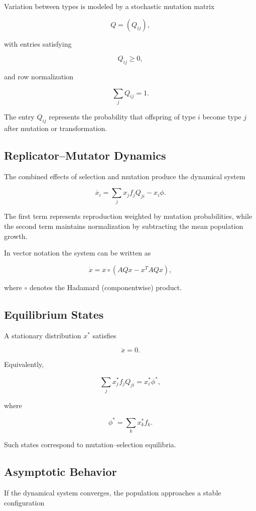 \documentclass[12pt]{article}
\begin{document}
Variation between types is modeled by a stochastic mutation matrix

\[
Q = (Q_{ij}),
\]

with entries satisfying

\[
Q_{ij} \ge 0,
\]

and row normalization

\[
\sum_j Q_{ij} = 1 .
\]

The entry $Q_{ij}$ represents the probability that offspring of type $i$ become type $j$ after mutation or transformation.

\subsection{Replicator--Mutator Dynamics}

The combined effects of selection and mutation produce the dynamical system

\[
\dot{x_i} = \sum_j x_j f_j Q_{ji} - x_i \phi .
\]

The first term represents reproduction weighted by mutation probabilities, while the second term maintains normalization by subtracting the mean population growth.

In vector notation the system can be written as

\[
\dot{x} = x \circ (AQx - x^T AQx),
\]

where $\circ$ denotes the Hadamard (componentwise) product.

\subsection{Equilibrium States}

A stationary distribution $x^*$ satisfies

\[
\dot{x} = 0.
\]

Equivalently,

\[
\sum_j x_j^* f_j Q_{ji} = x_i^* \phi^* ,
\]

where

\[
\phi^* = \sum_k x_k^* f_k .
\]

Such states correspond to mutation--selection equilibria.

\subsection{Asymptotic Behavior}

If the dynamical system converges, the population approaches a stable configuration
\end{document}
